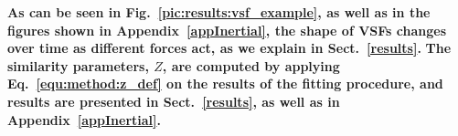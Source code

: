 \textbf{
    As can be seen in Fig.~\ref{pic:results:vsf_example}, as well as in the figures shown in Appendix~\ref{appInertial}, the shape of VSFs changes over time
     as different forces act, as we explain in Sect.~\ref{results}.  
}
%
\textbf{
    The similarity parameters, $Z$, are computed by applying Eq.~\ref{equ:method:z_def} on the results of the fitting procedure, and results are presented in Sect.~\ref{results}, as well as in Appendix~\ref{appInertial}.
}

